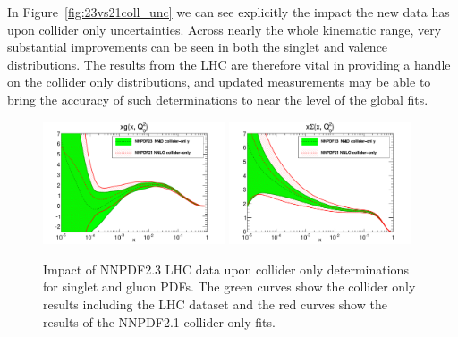 In Figure~\ref{fig:23vs21coll_unc} we can see explicitly the impact the new data has upon collider only uncertainties. Across nearly the whole kinematic range, very substantial improvements can be seen in both the singlet and valence distributions. The results from the LHC are therefore vital in providing a handle on the collider only distributions, and updated measurements may be able to bring the accuracy of such determinations to near the level of the global fits.

\begin{figure}[h]
\centering
\includegraphics[width=0.48\textwidth]{6-LHCimpact/figs/pdf_xg_log_band_comparison.pdf}
\includegraphics[width=0.48\textwidth]{6-LHCimpact/figs/pdf_xSigma_log_band_comparison.pdf}
\caption[Impact of NNPDF2.3 LHC data upon collider only determinations for singlet and gluon PDFs]{Impact of NNPDF2.3 LHC data upon collider only determinations for singlet and gluon PDFs. The green curves show the collider only results including the LHC dataset and the red curves show the results of the NNPDF2.1 collider only fits.}
\label{fig:23vs21coll_gs}
\end{figure}


